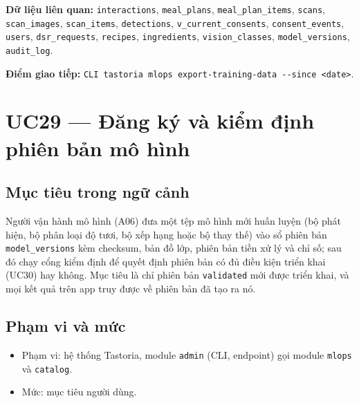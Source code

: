 \textbf{Dữ liệu liên quan:} {\small\texttt{interactions}}, {\small\texttt{meal\_\allowbreak{}\allowbreak{}plans}}, {\small\texttt{meal\_\allowbreak{}\allowbreak{}plan\_\allowbreak{}\allowbreak{}items}}, {\small\texttt{scans}}, {\small\texttt{scan\_\allowbreak{}\allowbreak{}images}}, {\small\texttt{scan\_\allowbreak{}\allowbreak{}items}}, {\small\texttt{detections}}, {\small\texttt{v\_\allowbreak{}\allowbreak{}current\_\allowbreak{}\allowbreak{}consents}}, {\small\texttt{consent\_\allowbreak{}\allowbreak{}events}}, {\small\texttt{users}}, {\small\texttt{dsr\_\allowbreak{}\allowbreak{}requests}}, {\small\texttt{recipes}}, {\small\texttt{ingredients}}, {\small\texttt{vision\_\allowbreak{}\allowbreak{}classes}}, {\small\texttt{model\_\allowbreak{}\allowbreak{}versions}}, {\small\texttt{audit\_\allowbreak{}\allowbreak{}log}}.

\textbf{Điểm giao tiếp:} {\small\texttt{CLI tastoria mlops export-\allowbreak{}training-\allowbreak{}data -\allowbreak{}-\allowbreak{}since <date>}}.

\section{UC29 --- Đăng ký và kiểm định phiên bản mô hình}
\subsection{Mục tiêu trong ngữ cảnh}
Người vận hành mô hình (A06) đưa một tệp mô hình mới huấn luyện (bộ phát hiện, bộ phân loại độ tươi, bộ xếp hạng hoặc bộ thay thế) vào sổ phiên bản {\small\texttt{model\_\allowbreak{}\allowbreak{}versions}} kèm checksum, bản đồ lớp, phiên bản tiền xử lý và chỉ số; sau đó chạy cổng kiểm định để quyết định phiên bản có đủ điều kiện triển khai (UC30) hay không. Mục tiêu là chỉ phiên bản {\small\texttt{validated}} mới được triển khai, và mọi kết quả trên app truy được về phiên bản đã tạo ra nó.

\subsection{Phạm vi và mức}
\begin{itemize}
\item Phạm vi: hệ thống Tastoria, module {\small\texttt{admin}} (CLI, endpoint) gọi module {\small\texttt{mlops}} và {\small\texttt{catalog}}.
\item Mức: mục tiêu người dùng.
\end{itemize}
